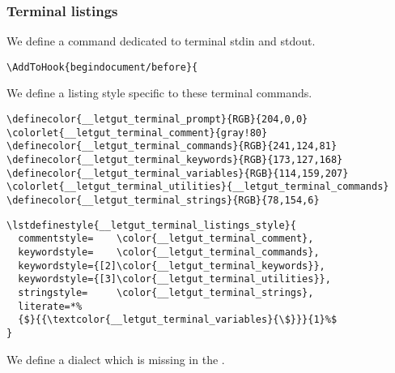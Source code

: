 \documentclass{letgut}
\begin{document}
\subsubsection{Terminal listings}
\label{ImplementationListingsTerminallistings-fq5h55h0jlj0}
We define a command dedicated to terminal stdin and stdout.

\begin{lstlisting}
\AddToHook{begindocument/before}{
\end{lstlisting}

We define a listing style specific to these terminal commands.

\begin{lstlisting}
\definecolor{__letgut_terminal_prompt}{RGB}{204,0,0}
\colorlet{__letgut_terminal_comment}{gray!80}
\definecolor{__letgut_terminal_commands}{RGB}{241,124,81}
\definecolor{__letgut_terminal_keywords}{RGB}{173,127,168}
\definecolor{__letgut_terminal_variables}{RGB}{114,159,207}
\colorlet{__letgut_terminal_utilities}{__letgut_terminal_commands}
\definecolor{__letgut_terminal_strings}{RGB}{78,154,6}
\end{lstlisting}

\begin{lstlisting}
\lstdefinestyle{__letgut_terminal_listings_style}{
  commentstyle=    \color{__letgut_terminal_comment},
  keywordstyle=    \color{__letgut_terminal_commands},
  keywordstyle={[2]\color{__letgut_terminal_keywords}},
  keywordstyle={[3]\color{__letgut_terminal_utilities}},
  stringstyle=     \color{__letgut_terminal_strings},
  literate=*%
  {$}{{\textcolor{__letgut_terminal_variables}{\$}}}{1}%$
}
\end{lstlisting}

We define a dialect which is missing in the .
\end{document}
